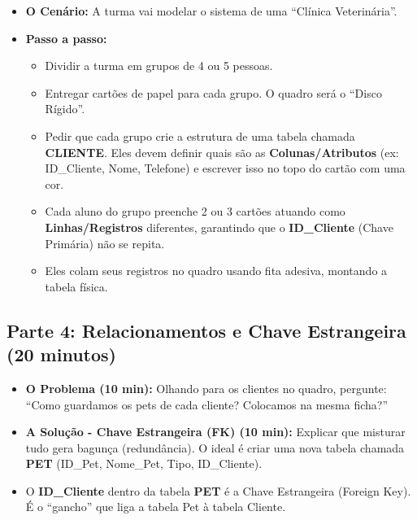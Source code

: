 \documentclass[12pt,a4paper]{article}
\begin{document}
\begin{itemize}[leftmargin=*,itemsep=0.35em]
  \item \textbf{O Cenário:} A turma vai modelar o sistema de uma ``Clínica Veterinária''.
  \item \textbf{Passo a passo:}
  \begin{itemize}[leftmargin=*,itemsep=0.25em]
    \item Dividir a turma em grupos de 4 ou 5 pessoas.
    \item Entregar cartões de papel para cada grupo. O quadro será o ``Disco Rígido''.
    \item Pedir que cada grupo crie a estrutura de uma tabela chamada \textbf{CLIENTE}. Eles devem definir quais são as \textbf{Colunas/Atributos} (ex: ID\_Cliente, Nome, Telefone) e escrever isso no topo do cartão com uma cor.
    \item Cada aluno do grupo preenche 2 ou 3 cartões atuando como \textbf{Linhas/Registros} diferentes, garantindo que o \textbf{ID\_Cliente} (Chave Primária) não se repita.
    \item Eles colam seus registros no quadro usando fita adesiva, montando a tabela física.
  \end{itemize}
\end{itemize}

\subsection*{Parte 4: Relacionamentos e Chave Estrangeira (20 minutos)}
\begin{itemize}[leftmargin=*,itemsep=0.35em]
  \item \textbf{O Problema (10 min):} Olhando para os clientes no quadro, pergunte: ``Como guardamos os pets de cada cliente? Colocamos na mesma ficha?''
  \item \textbf{A Solução - Chave Estrangeira (FK) (10 min):} Explicar que misturar tudo gera bagunça (redundância). O ideal é criar uma nova tabela chamada \textbf{PET} (ID\_Pet, Nome\_Pet, Tipo, ID\_Cliente).
  \item O \textbf{ID\_Cliente} dentro da tabela \textbf{PET} é a Chave Estrangeira (Foreign Key). É o ``gancho'' que liga a tabela Pet à tabela Cliente.
\end{itemize}
\end{document}
